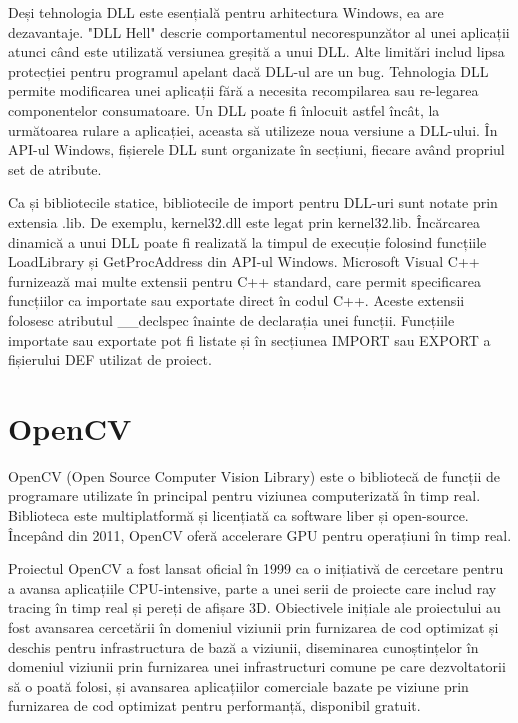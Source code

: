 \documentclass[a4paper,12pt]{report}
\begin{document}
Deși tehnologia DLL este esențială pentru arhitectura Windows, ea are dezavantaje. "DLL Hell" descrie comportamentul necorespunzător al unei aplicații atunci când este utilizată versiunea greșită a unui DLL. Alte limitări includ lipsa protecției pentru programul apelant dacă DLL-ul are un bug. Tehnologia DLL permite modificarea unei aplicații fără a necesita recompilarea sau re-legarea componentelor consumatoare. Un DLL poate fi înlocuit astfel încât, la următoarea rulare a aplicației, aceasta să utilizeze noua versiune a DLL-ului. În API-ul Windows, fișierele DLL sunt organizate în secțiuni, fiecare având propriul set de atribute.

Ca și bibliotecile statice, bibliotecile de import pentru DLL-uri sunt notate prin extensia .lib. De exemplu, kernel32.dll este legat prin kernel32.lib. Încărcarea dinamică a unui DLL poate fi realizată la timpul de execuție folosind funcțiile LoadLibrary și GetProcAddress din API-ul Windows. Microsoft Visual C++ furnizează mai multe extensii pentru C++ standard, care permit specificarea funcțiilor ca importate sau exportate direct în codul C++. Aceste extensii folosesc atributul \_\_declspec înainte de declarația unei funcții. Funcțiile importate sau exportate pot fi listate și în secțiunea IMPORT sau EXPORT a fișierului DEF utilizat de proiect.

\section{OpenCV}
OpenCV (Open Source Computer Vision Library) este o bibliotecă de funcții de programare utilizate în principal pentru viziunea computerizată în timp real. Biblioteca este multiplatformă și licențiată ca software liber și open-source. Începând din 2011, OpenCV oferă accelerare GPU pentru operațiuni în timp real.

Proiectul OpenCV a fost lansat oficial în 1999 ca o inițiativă de cercetare pentru a avansa aplicațiile CPU-intensive, parte a unei serii de proiecte care includ ray tracing în timp real și pereți de afișare 3D. Obiectivele inițiale ale proiectului au fost avansarea cercetării în domeniul viziunii prin furnizarea de cod optimizat și deschis pentru infrastructura de bază a viziunii, diseminarea cunoștințelor în domeniul viziunii prin furnizarea unei infrastructuri comune pe care dezvoltatorii să o poată folosi, și avansarea aplicațiilor comerciale bazate pe viziune prin furnizarea de cod optimizat pentru performanță, disponibil gratuit.
\end{document}
